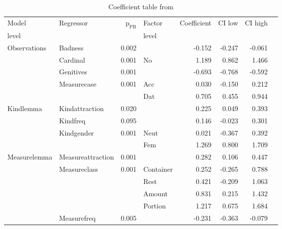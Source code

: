 \begin{table}
  \centering
  \caption{Coefficient table from \citet{Schaefer2018}}
    \begin{tabular}{llrlrrrc}
      \toprule
    Model           & Regressor         & $\text{p}_{\text{PB}}$ & Factor       & Coefficient & CI low & CI high \\
    level           &                   &                        & level        &             &        &         \\

    \midrule
    Observations    & Badness           &  0.002                 &              & -0.152      & -0.247 & -0.061  \\
                    & Cardinal          &  0.001                 & No           &  1.189      &  0.862 &  1.466  \\
                    & Genitives         &  0.001                 &              & -0.693      & -0.768 & -0.592  \\
                    & Measurecase       &  0.001                 & Acc          &  0.030      & -0.150 &  0.212  \\
                    &                   &                        & Dat          &  0.705      &  0.455 &  0.944  \\[0.5\baselineskip]
    
    Kindlemma       & Kindattraction    &  0.020                 &              &  0.225      &  0.049 &  0.393  \\
                    & Kindfreq          &  0.095                 &              &  0.146      & -0.023 &  0.301  \\
                    & Kindgender        &  0.001                 & Neut         &  0.021      & -0.367 &  0.392  \\
                    &                   &                        & Fem          &  1.269      &  0.800 &  1.709  \\[0.5\baselineskip]
    
    Measurelemma    & Measureattraction &  0.001                 &              &  0.282      &  0.106 &  0.447  \\
                    & Measureclass      &  0.001                 & Container    &  0.252      & -0.265 &  0.788  \\
                    &                   &                        & Rest         &  0.421      & -0.209 &  1.063  \\
                    &                   &                        & Amount       &  0.831      &  0.215 &  1.432  \\
                    &                   &                        & Portion      &  1.217      &  0.675 &  1.684  \\
                    & Measurefreq       &  0.005                 &              & -0.231      & -0.363 & -0.079  \\
  \bottomrule

  \end{tabular}
  \label{tab:bigtable}
\end{table}


